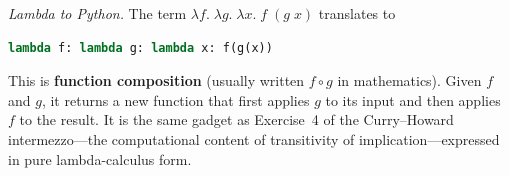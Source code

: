 \documentclass[11pt]{article}
\begin{document}
\emph{Lambda to Python.}  The term $\lambda f.\;\lambda g.\;\lambda
x.\; f\;(g\; x)$ translates to
\begin{lstlisting}[language=Python]
lambda f: lambda g: lambda x: f(g(x))
\end{lstlisting}

This is \textbf{function composition} (usually written $f \circ g$
in mathematics).  Given $f$ and $g$, it returns a new function that
first applies $g$ to its input and then applies $f$ to the result.
It is the same gadget as Exercise~4 of the Curry--Howard
intermezzo---the computational content of transitivity of
implication---expressed in pure lambda-calculus form.
\end{document}
